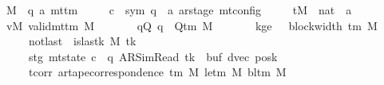 \begin{isabellebody}
\ \ \ M\ {\isacharcolon}{\kern0pt}{\isacharcolon}{\kern0pt}\ {\isachardoublequoteopen}{\isacharparenleft}{\kern0pt}{\isacharprime}{\kern0pt}q{\isacharcomma}{\kern0pt}\ {\isacharprime}{\kern0pt}a{\isacharparenright}{\kern0pt}\ mttm{\isachardoublequoteclose}\isanewline
\ \ \ \ \ c{\isacharprime}{\kern0pt}\ {\isacharcolon}{\kern0pt}{\isacharcolon}{\kern0pt}\ {\isachardoublequoteopen}{\isacharparenleft}{\kern0pt}sym{}{\isacharcomma}{\kern0pt}\ {\isacharprime}{\kern0pt}q\ {\isasymtimes}\ {\isacharprime}{\kern0pt}a\ ar{\isacharunderscore}{\kern0pt}stage{\isacharparenright}{\kern0pt}\ mt{\isacharunderscore}{\kern0pt}config{\isachardoublequoteclose}\isanewline
\ \ \ \ \ tM\ {\isacharcolon}{\kern0pt}{\isacharcolon}{\kern0pt}\ {\isachardoublequoteopen}nat\ {\isasymRightarrow}\ {\isacharprime}{\kern0pt}a{\isachardoublequoteclose}\isanewline
\ \ \ vM{\isacharcolon}{\kern0pt}\ {\isachardoublequoteopen}valid{\isacharunderscore}{\kern0pt}mttm\ M{\isachardoublequoteclose}\isanewline
\ \ \ \ \ \ \ qQ{\isacharcolon}{\kern0pt}\ {\isachardoublequoteopen}q\ {\isasymin}\ Q{\isacharunderscore}{\kern0pt}tm\ M{\isachardoublequoteclose}\isanewline
\ \ \ \ \ \ \ kge{}{\isacharcolon}{\kern0pt}\ {\isachardoublequoteopen}{}\ {\isasymle}\ block{\isacharunderscore}{\kern0pt}width\ {\isacharparenleft}{\kern0pt}{\isasymGamma}{\isacharunderscore}{\kern0pt}tm\ M{\isacharparenright}{\kern0pt}{\isachardoublequoteclose}\isanewline
\ \ \ \ \ \ \ notlast{\isacharcolon}{\kern0pt}\ {\isachardoublequoteopen}{\isasymnot}\ is{\isacharunderscore}{\kern0pt}last{\isacharunderscore}{\kern0pt}k\ M\ tk{\isachardoublequoteclose}\isanewline
\ \ \ \ \ \ \ stg{\isacharcolon}{\kern0pt}\ {\isachardoublequoteopen}mt{\isacharunderscore}{\kern0pt}state\ c{\isacharprime}{\kern0pt}\ {\isacharequal}{\kern0pt}\ {\isacharparenleft}{\kern0pt}q{\isacharcomma}{\kern0pt}\ AR{\isacharunderscore}{\kern0pt}SimRead{\isacharcomma}{\kern0pt}\ tk{\isacharcomma}{\kern0pt}\ {}{\isacharcomma}{\kern0pt}\ buf{\isacharcomma}{\kern0pt}\ dvec{\isacharcomma}{\kern0pt}\ posk{\isacharparenright}{\kern0pt}{\isachardoublequoteclose}\isanewline
\ \ \ \ \ \ \ tcorr{\isacharcolon}{\kern0pt}\ {\isachardoublequoteopen}ar{\isacharunderscore}{\kern0pt}tape{\isacharunderscore}{\kern0pt}correspondence\ {\isacharparenleft}{\kern0pt}{\isasymGamma}{\isacharunderscore}{\kern0pt}tm\ M{\isacharparenright}{\kern0pt}\ {\isacharparenleft}{\kern0pt}le{\isacharunderscore}{\kern0pt}tm\ M{\isacharparenright}{\kern0pt}\ {\isacharparenleft}{\kern0pt}bl{\isacharunderscore}{\kern0pt}tm\ M{\isacharparenright}{\kern0pt}\isanewline

\end{isabellebody}
